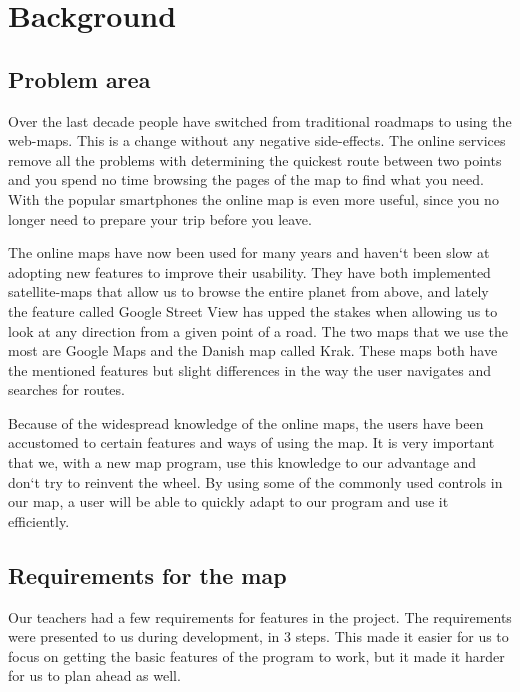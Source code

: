 \chapter{Background}
\label{BG}
\section{Problem area}
\label{BG-PR}
Over the last decade people have switched from traditional roadmaps 
to using the web-maps. This is a change without any negative side-effects. 
The online services remove all the problems with determining the quickest 
route between two points and you spend no time browsing the pages of 
the map to find what you need. With the popular smartphones the online 
map is even more useful, since you no longer need to prepare your trip 
before you leave.

The online maps have now been used for many years and haven`t been slow 
at adopting new features to improve their usability. They have both 
implemented satellite-maps that allow us to browse the entire planet 
from above, and lately the feature called Google Street View has upped 
the stakes when allowing us to look at any direction from a given point 
of a road. The two maps that we use the most are Google Maps and the 
Danish map called Krak. These maps both have the mentioned features 
but slight differences in the way the user navigates and searches 
for routes.

Because of the widespread knowledge of the online maps, the users 
have been accustomed to certain features and ways of using the map. 
It is very important that we, with a new map program, use this knowledge 
to our advantage and don`t try to reinvent the wheel. By using some 
of the commonly used controls in our map, a user will be able to quickly 
adapt to our program and use it efficiently. 

\section{Requirements for the map}
\label{BG-R}
Our teachers had a few requirements for features in the project. The
requirements were presented to us during development, in 3 steps. This made it
easier for us to focus on getting the basic features of the program to work, but
it made it harder for us to plan ahead as well.

